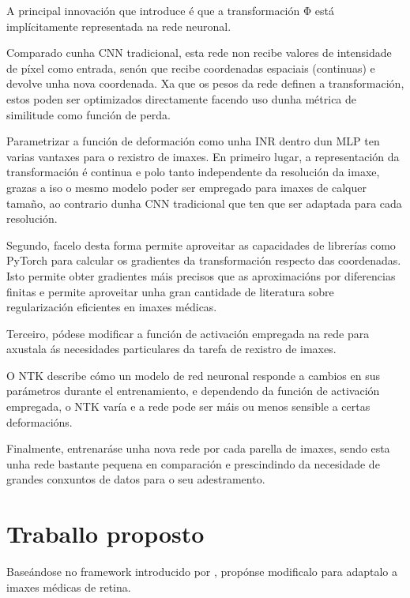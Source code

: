 A principal innovación que introduce \cite{wolterink2021implicit} é que a transformación Φ está implícitamente representada na rede neuronal.

Comparado cunha CNN tradicional, esta rede non recibe valores de intensidade de píxel como entrada,
senón que recibe coordenadas espaciais (continuas) e devolve unha nova coordenada.
Xa que os pesos da rede definen a transformación, estos poden ser optimizados directamente 
facendo uso dunha métrica de similitude como función de perda.

Parametrizar a función de deformación como unha INR dentro dun MLP ten varias vantaxes para o rexistro de imaxes.
En primeiro lugar, a representación da transformación é continua e polo tanto independente da resolución da imaxe, 
grazas a iso o mesmo modelo poder ser empregado para imaxes de calquer tamaño, ao contrario dunha CNN tradicional 
que ten que ser adaptada para cada resolución.

Segundo, facelo desta forma permite aproveitar as capacidades de librerías como PyTorch para calcular os gradientes da transformación respecto das coordenadas.
Isto permite obter gradientes máis precisos que as aproximacións por diferencias finitas 
e permite aproveitar unha gran cantidade de literatura sobre regularización eficientes en imaxes médicas.

Terceiro, pódese modificar a función de activación empregada na rede para axustala ás necesidades particulares da tarefa de rexistro de imaxes.

O \gls{NTK} describe cómo un modelo de red neuronal responde a cambios en sus parámetros durante el entrenamiento,
e dependendo da función de activación empregada, o NTK varía e a rede pode ser máis ou menos sensible a certas deformacións.

Finalmente, entrenaráse unha nova rede por cada parella de imaxes, sendo esta unha rede bastante pequena en comparación e prescindindo da necesidade de grandes conxuntos de datos para o seu adestramento.

\section{Traballo proposto}
\label{sec:Traballo proposto}

Baseándose no framework introducido por \cite{wolterink2021implicit},
 propónse modificalo para adaptalo a imaxes médicas de retina.
